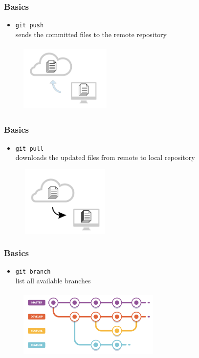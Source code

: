\documentclass{beamer}
\begin{document}
\begin{frame}[fragile]
\frametitle{Basics}
\begin{itemize}
\item \verb!git push! \\ 
sends the committed files to the remote repository
\end{itemize}
\begin{figure}
\centering
\includegraphics[height=3.5cm, width=4.5cm]{push}
\end{figure}
\end{frame}

\begin{frame}[fragile]
\frametitle{Basics}
\begin{itemize}
\item \verb!git pull! \\ 
downloads the updated files from remote to local repository
\end{itemize}
\begin{figure}
\centering
\includegraphics[height=3.5cm, width=4.5cm]{pull}
\end{figure}
\end{frame}

\begin{frame}[fragile]
\frametitle{Basics}
\begin{itemize}
\item \verb!git branch! \\ 
list all available branches
\end{itemize}
\begin{figure}
\centering
\includegraphics[height=3.5cm, width=7cm]{branching}
\end{figure}
\end{frame}
\end{document}
